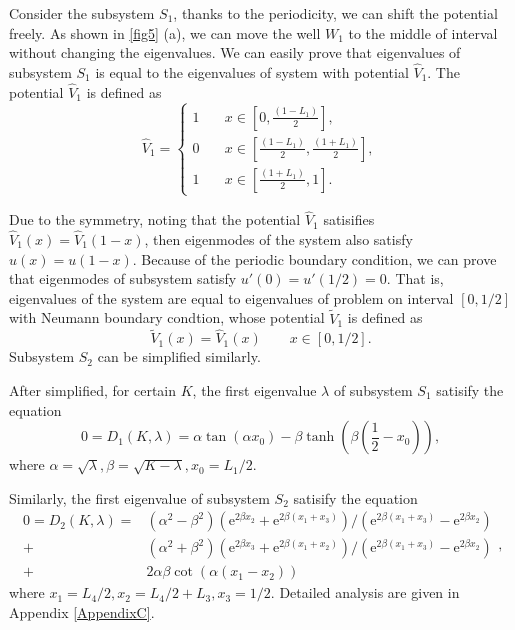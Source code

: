 \documentclass[a4paper,11pt]{article}
\begin{document}
Consider the subsystem $S_1$, thanks to the periodicity, we can shift the potential freely. As shown in \ref{fig5} (a), we can move the well $W_1$ to the middle of interval without changing the eigenvalues. We can easily prove that eigenvalues of subsystem $S_1$ is equal to the eigenvalues of system with potential $\hat{V}_1$. The potential $\hat{V}_1$ is defined as
\begin{equation}
\hat{V}_1 = \left\{
\begin{split}
1 & \quad x \in [0, \frac{(1 - L_1)}{2}], \\
0 & \quad x \in [\frac{(1 - L_1)}{2}, \frac{(1 + L_1)}{2}], \\
1 & \quad x \in [\frac{(1 + L_1)}{2}, 1].
\end{split}
\right.
\end{equation}

Due to the symmetry, noting that the potential $\hat{V}_1$ satisifies $\hat{V}_1(x) = \hat{V}_1(1-x)$, then eigenmodes of the system also satisfy $u(x) = u(1-x)$. Because of the periodic boundary condition, we can prove that eigenmodes of subsystem satisfy $u'(0) = u'(1/2) = 0$. That is, eigenvalues of the system are equal to eigenvalues of problem on interval $[0, 1/2]$ with Neumann boundary condtion, whose potential $\tilde{V}_1$ is defined as
\begin{equation}
\tilde{V}_1(x) = \hat{V}_1(x) \qquad x \in [0, 1/2].
\end{equation}
Subsystem $S_2$ can be simplified similarly.

After simplified, for certain $K$, the first eigenvalue $\lambda$ of subsystem $S_1$ satisify the equation
\begin{equation}\label{phase1}
0 = D_1(K, \lambda) = \alpha \tan(\alpha x_0) - \beta \tanh(\beta (\frac12 - x_0)),
\end{equation}
where $\alpha = \sqrt{\lambda}, \beta = \sqrt{K - \lambda}, x_0 = L_1 / 2$.

Similarly, the first eigenvalue of subsystem $S_2$ satisify the equation
\begin{equation}\label{phase2}
\begin{split}
0 = D_2(K, \lambda) = & (\alpha^2 - \beta^2)(\mathrm{e}^{2 \beta x_2} + \mathrm{e}^{2 \beta (x_1+x_3)}) / (\mathrm{e}^{2 \beta (x_1+x_3)} - \mathrm{e}^{2 \beta x_2}) \\
+ & (\alpha^2 + \beta^2)(\mathrm{e}^{2 \beta x_3} + \mathrm{e}^{2 \beta (x_1+x_2)}) / (\mathrm{e}^{2 \beta (x_1+x_3)} - \mathrm{e}^{2 \beta x_2}) \\
+ & 2 \alpha \beta \cot(\alpha (x_1 - x_2))
\end{split},
\end{equation}
where $x_1 = L_4 / 2, x_2 = L_4 / 2 + L_3, x_3 = 1 / 2$. Detailed analysis are given in Appendix \ref{AppendixC}.
\end{document}
